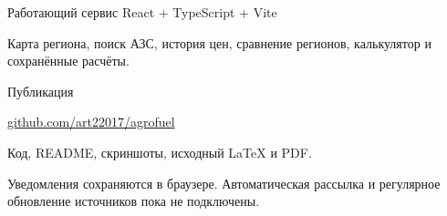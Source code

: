 \documentclass[aspectratio=169,11pt]{beamer}
\begin{document}
\begin{frame}{Работающий сервис}
{\Large React + TypeScript + Vite}\par\vspace{6mm}
Карта региона, поиск АЗС, история цен, сравнение регионов, калькулятор и сохранённые расчёты.\par\vspace{6mm}
{\color{accent}\large Публикация}\par\vspace{3mm}
\href{https://github.com/art22017/agrofuel}{github.com/art22017/agrofuel}\par\vspace{5mm}
Код, README, скриншоты, исходный LaTeX и PDF.\par\vspace{5mm}
{\small Уведомления сохраняются в браузере. Автоматическая рассылка и регулярное обновление источников пока не подключены.}
\end{frame}
\end{document}
